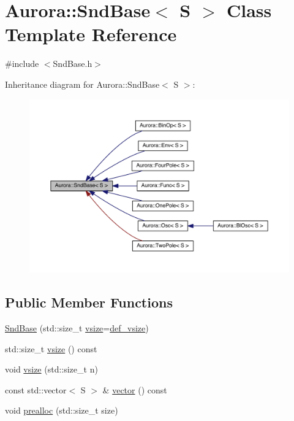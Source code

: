 \hypertarget{class_aurora_1_1_snd_base}{}\section{Aurora\+:\+:Snd\+Base$<$ S $>$ Class Template Reference}
\label{class_aurora_1_1_snd_base}


{\ttfamily \#include $<$Snd\+Base.\+h$>$}



Inheritance diagram for Aurora\+:\+:Snd\+Base$<$ S $>$\+:\nopagebreak
\begin{figure}[H]
\begin{center}
\leavevmode
\includegraphics[width=350pt]{class_aurora_1_1_snd_base__inherit__graph}
\end{center}
\end{figure}
\subsection*{Public Member Functions}
\begin{DoxyCompactItemize}
\item 
\hyperlink{class_aurora_1_1_snd_base_a960739d3ae63df581c28f8801e589a3c}{Snd\+Base} (std\+::size\+\_\+t \hyperlink{class_aurora_1_1_snd_base_af9e21aaf411b17f7a8221c991ce5d291}{vsize}=\hyperlink{namespace_aurora_afaaddf667a06e7ce23c667a8b7295263}{def\+\_\+vsize})
\item 
std\+::size\+\_\+t \hyperlink{class_aurora_1_1_snd_base_af9e21aaf411b17f7a8221c991ce5d291}{vsize} () const
\item 
void \hyperlink{class_aurora_1_1_snd_base_a88dacba995eef179f2fc97e11a331913}{vsize} (std\+::size\+\_\+t n)
\item 
const std\+::vector$<$ S $>$ \& \hyperlink{class_aurora_1_1_snd_base_acf9171085003208901e23c1f50520345}{vector} () const
\item 
void \hyperlink{class_aurora_1_1_snd_base_a5d57c3b735e5d583b4b4ae5f8e9cdf4c}{prealloc} (std\+::size\+\_\+t size)
\end{DoxyCompactItemize}
